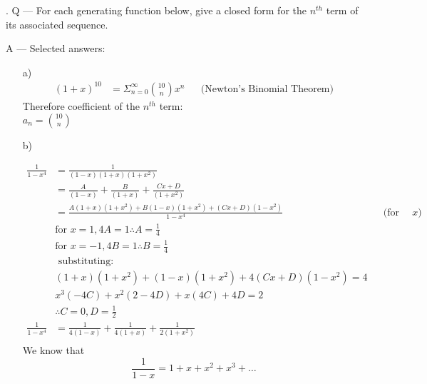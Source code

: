\documentclass{article}
\newcounter{question}
\begin{document}
\newcommand\Que[1]{%
   \leavevmode\par
   \stepcounter{question}
   \noindent
   \thequestion. Q --- #1\par}

\newcommand\Ans[2][]{%
    \leavevmode\par\noindent
   {\leftskip37pt
    A --- \textbf{#1}#2\par}}

\Que{
    For each generating function below, give a closed
    form for the $n^{th}$ term of its associated sequence.
    }
\Ans{
    Selected answers:
    \begin{enumerate}[label=\alph*]
        \item[a)]{
            \begin{align*}
                (1+x)^{10}
                & = \Sigma_{n=0}^{\infty} {10 \choose n} x^n
                && \text{(Newton's Binomial Theorem)}
            \end{align*}
            Therefore coefficient of the $n^{th}$ term:\\

            $\boxed{a_n = {10 \choose n} }$\\
        }
        \item[b)]{
            \begin{align*}
                \frac{1}{1-x^4}
                & = \frac{1}{(1-x)(1+x)(1+x^2)}\\
                & = \frac{A}{(1-x)} + \frac{B}{(1+x)} + \frac{Cx+D}{(1+x^2)}\\
                & = \frac{A(1+x)(1+x^2) + B(1-x)(1+x^2) + (Cx+D)(1-x^2)}{1-x^4}
                && \text{(for all $x$)}\\
                & \text{for $x=1$}, 4A = 1 \therefore \boxed{A=\frac{1}{4}}\\
                & \text{for $x=-1$}, 4B = 1 \therefore \boxed{B=\frac{1}{4}}\\
                & \text{ substituting:}\\
                & (1+x)(1+x^2) + (1-x)(1+x^2)+4(Cx+D)(1-x^2) = 4\\
                & x^3(-4C) + x^2(2-4D) + x(4C) + 4D = 2\\
                & \therefore \boxed{C=0}, \boxed{D=\frac{1}{2}}\\
                \frac{1}{1-x^4}
                & = \frac{1}{4(1-x)} + \frac{1}{4(1+x)} + \frac{1}{2(1+x^2)}\\
            \end{align*}
            We know that
            \begin{equation}
                \frac{1}{1-x} = 1+x+x^2+x^3+\dots
            \end{equation}

}
\end{enumerate}}
\end{document}
